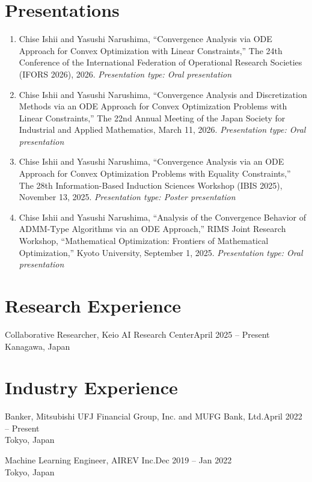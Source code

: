 \documentclass[11pt,a4paper]{article}
\newcommand{\experienceentry}[3]{%
  #1\hfill #2\\
  #3\par\vspace{4pt}
}
\begin{document}
\section{Presentations}

\begin{enumerate}
    \item Chise Ishii and Yasushi Narushima,
    ``Convergence Analysis via ODE Approach for Convex Optimization
    with Linear Constraints,''
    The 24th Conference of the International Federation of Operational
    Research Societies (IFORS 2026), 2026.
    \textit{Presentation type: Oral presentation} 

    \item Chise Ishii and Yasushi Narushima,
    ``Convergence Analysis and Discretization Methods via an ODE Approach
    for Convex Optimization Problems with Linear Constraints,''
    The 22nd Annual Meeting of the Japan Society for Industrial and
    Applied Mathematics, March 11, 2026.
    \textit{Presentation type: Oral presentation} 

    \item Chise Ishii and Yasushi Narushima,
    ``Convergence Analysis via an ODE Approach for Convex Optimization
    Problems with Equality Constraints,''
    The 28th Information-Based Induction Sciences Workshop (IBIS 2025),
    November 13, 2025.
    \textit{Presentation type: Poster presentation} 

    \item Chise Ishii and Yasushi Narushima,
    ``Analysis of the Convergence Behavior of ADMM-Type Algorithms
    via an ODE Approach,''
    RIMS Joint Research Workshop, ``Mathematical Optimization:
    Frontiers of Mathematical Optimization,'' Kyoto University,
    September 1, 2025.
    \textit{Presentation type: Oral presentation} 
\end{enumerate}

\section{Research Experience}
 \experienceentry
   {Collaborative Researcher, Keio AI Research Center}
   {April 2025 -- Present}
   {Kanagawa, Japan}

\section{Industry Experience}
 \experienceentry
   {Banker, Mitsubishi UFJ Financial Group, Inc. and MUFG Bank, Ltd.}
   {April 2022 -- Present}
   {Tokyo, Japan}
 \experienceentry
   {Machine Learning Engineer, AIREV Inc.}
   {Dec 2019 -- Jan 2022}
   {Tokyo, Japan}
\end{document}
